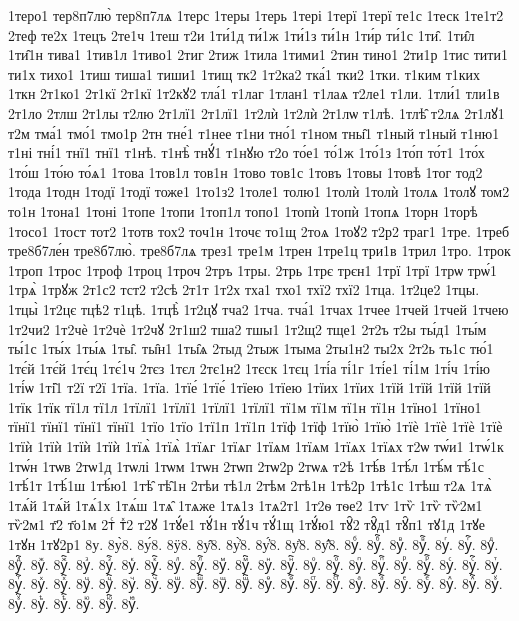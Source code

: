 {1теро1
тер8п7лю̀
тер8п7лѧ
1терс
1теры
1терь
1тері
1терї
1терї
те1с
1теск
1те1т2
2теф
те2х
1тецъ
2те1ч
1теш
т2и
1ти́1д
ти́1ж
1ти́1з
ти́1н
1ти́р
ти́1с
1ти̑.
1ти̑л
1ти̑1н
тива1
1тив1л
1тиво1
2тиг
2тиж
1тила
1тими1
2тин
тино1
2ти1р
1тис
тити1
ти1х
тихо1
1тиш
тиша1
тиши1
1тищ
тк2
1т2ка2
тка́1
тки2
1тки.
т1ким
т1ких
1ткн
2т1ко1
2т1кї
2т1кї
1т2кꙋ2
тла́1
т1лаг
1тлан1
т1лаѧ
т2ле1
т1ли.
1тли́1
тли1в
2т1ло
2тлш
2т1лы
т2лю
2т1лї1
2т1лї1
1т2лѝ
1т2лѝ
2т1лѡ
т1лѣ.
1тлѣ̑
т2лѧ
2т1лꙋ1
т2м
тма́1
тмо́1
тмо1р
2тн
тне́1
т1нее
т1ни
тно́1
т1ном
тны̑1
т1ный
т1ный
т1ню1
т1ні
тні́1
тнї1
тнї1
т1нѣ.
т1нѣ̀
тнꙋ́1
т1нꙋю
т2о
то́е1
то́1ж
1то́1з
1то́п
то́т1
1то́х
1то́ш
1то́ю
то́ѧ1
1това
1тов1л
тов1н
1тово
тов1с
1товъ
1товы
1товѣ
1тог
тод2
1тода
1тодн
1тодї
1тодї
тоже1
1то1з2
1толе1
толю1
1толѝ
1толѝ
1толѧ
1толꙋ
том2
то1н
1тона1
1тоні
1топе
1топи
1топ1л
топо1
1топѝ
1топѝ
1топѧ
1торн
1торѣ
1тосо1
1тост
тот2
1тотв
тох2
точ1н
1точє
то1щ
2тоѧ
1тоꙋ2
т2р2
траг1
1тре.
1треб
тре8б7ле́н
тре8б7лю̀.
тре8б7лѧ
трез1
тре1м
1трен
1тре1ц
три1в
1трил
1тро.
1трок
1троп
1трос
1троф
1троц
1троч
2тръ
1тры.
2трь
1трє
трєн1
1трї
1трї
1трѡ
трѡ́1
1трѧ̀
1трꙋж
2т1с2
тст2
т2сѣ
2т1т
1т2х
тха1
тхо1
тхї2
тхї2
1тца.
1т2це2
1тцы.
1тцы̀
1т2цє
тцѣ2
т1цѣ.
1тцѣ̀
1т2цꙋ
тча2
1тча.
тча́1
1тчах
1тчее
1тчей
1тчей
1тчею
1т2чи2
1т2чѐ
1т2чѐ
1т2чꙋ
2т1ш2
тша2
тшы1
1т2щ2
тще1
2т2ъ
т2ы
ты́д1
1ты́м
ты́1с
1ты́х
1ты́ѧ
1ты̑.
ты̑н1
1ты̑ѧ
2тыд
2тыж
1тыма
2ты1н2
ты2х
2т2ь
ть1с
тю́1
1тє́й
1тє́й
1тє́ц
1тє́1ч
2тєз
1тєл
2тє1н2
1тєск
1тєц
1ті́а
ті́1г
1ті́е1
ті́1м
1ті́ч
1ті́ю
1ті́ѡ
1ті̑1
т2ї
т2ї
1тїа.
1тїа.
1тїе́
1тїе́
1тїею
1тїею
1тїих
1тїих
1тїй
1тїй
1тїй
1тїй
1тїк
1тїк
тї1л
тї1л
1тїлї1
1тїлї1
1тїлї1
1тїлї1
тї1м
тї1м
тї1н
тї1н
1тїно1
1тїно1
тїнї1
тїнї1
тїнї1
тїнї1
1тїо
1тїо
1тї1п
1тї1п
1тїф
1тїф
1тїю̀
1тїю̀
1тїѐ
1тїѐ
1тїѐ
1тїѐ
1тїѝ
1тїѝ
1тїѝ
1тїѝ
1тїѧ̀
1тїѧ̀
1тїѧг
1тїѧг
1тїѧм
1тїѧм
1тїѧх
1тїѧх
т2ѡ
тѡ́и1
1тѡ́1к
1тѡ́н
1тѡв
2тѡ1д
1тѡлі
1тѡм
1тѡн
2тѡп
2тѡ2р
2тѡѧ
т2ѣ
1тѣ́в
1тѣ́л
1тѣ́м
тѣ́1с
1тѣ́1т
1тѣ́1ш
1тѣ́ю1
1тѣ̑
тѣ̑1н
2тѣи
тѣ1л
2тѣм
2тѣ1н
1тѣ2р
1тѣ1с
1тѣш
т2ѧ
1тѧ̀
1тѧ́й
1тѧ́й
1тѧ́1х
1тѧ́ш
1тѧ̑
1тѧже
1тѧ1з
1тѧ2т1
1т2ѳ
тѳе2
1тѵ
1тѷ
1тѷ
тѷ2м1
тѷ2м1
т҃2
т҃о1м
2тⷭ
тⷯ2
т2ꙋ
1тꙋ́е1
тꙋ́1н
тꙋ́1ч
тꙋ́1щ
1тꙋ́ю1
тꙋ̑2
тꙋ̑д1
тꙋ̑п1
тꙋ1д
1тꙋе
1тꙋн
1тꙋ2р1
8у.
8у̀8.
8у́8.
8ӱ8.
8у̑8.
8у҆̀8.
8у҆́8.
8у҆̈8.
8у҆̑8.
8уⷠ.
8уⷠ҇.
8уⷡ.
8уⷡ҇.
8уⷢ.
8уⷢ҇.
8уⷣ.
8уⷣ҇.
8уⷤ.
8уⷤ҇.
8уⷥ.
8уⷥ҇.
8уⷦ.
8уⷦ҇.
8уⷧ.
8уⷧ҇.
8уⷨ.
8уⷨ҇.
8уⷩ.
8уⷩ҇.
8уⷪ.
8уⷪ҇.
8уⷫ.
8уⷫ҇.
8уⷬ.
8уⷬ҇.
8уⷭ.
8уⷭ҇.
8уⷮ.
8уⷮ҇.
8уⷯ.
8уⷯ҇.
8уⷰ.
8уⷰ҇.
8уⷱ.
8уⷱ҇.
8уⷲ.
8уⷲ҇.
8уⷳ.
8уⷳ҇.
8уⷴ.
8уⷴ҇.
8уⷵ.
8уⷵ҇.
8уⷶ.
8уⷶ҇.
8уⷷ.
8уⷷ҇.
8уⷸ.
8уⷸ҇.
8уⷹ.
8уⷹ҇.
8уⷺ.
8уⷺ҇.
8уⷻ.
8уⷻ҇.
8уⷼ.
}
